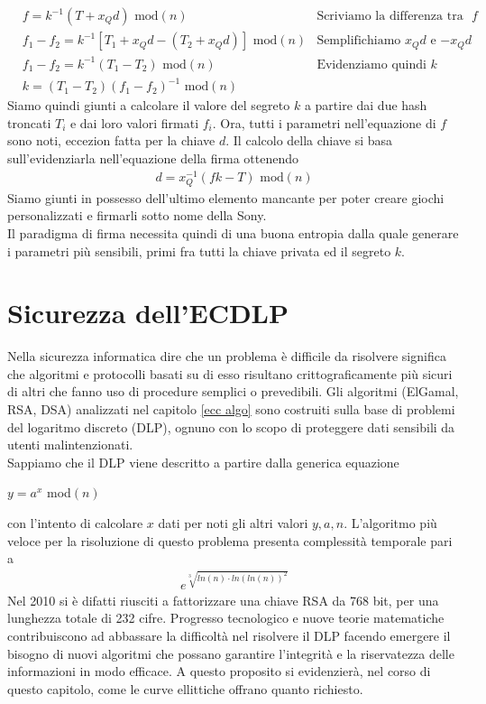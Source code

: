 \documentclass[a4paper,12pt]{tesiinfo}
\begin{document}
\begin{align*}
  &f = k^{-1} (T+x_Qd) \text{ mod}(n) &\text{Scriviamo la differenza tra le due $f$}\\
  &f_1 - f_2 = k^{-1} [T_1+x_Qd - (T_2 + x_Qd)] \text{ mod}(n) &\text{Semplifichiamo $x_Qd$ e $-x_Qd$}\\
  &f_1 - f_2 = k^{-1} (T_1 - T_2) \text{ mod$(n)$} &\text{Evidenziamo quindi $k$}\\
  &k= (T_1 - T_2)(f_1 - f_2)^{-1} \text{ mod$(n)$}
\end{align*}
Siamo quindi giunti a calcolare il valore del segreto $k$ a partire dai due hash troncati $T_i$ e dai loro valori firmati $f_i$. Ora, tutti i parametri nell'equazione di $f$ sono noti, eccezion fatta per la chiave $d$. Il calcolo della chiave si basa sull'evidenziarla nell'equazione della firma ottenendo
\begin{align*}
  d = x_Q^{-1}(fk-T) \text{ mod}(n) 
\end{align*}
Siamo giunti in possesso dell'ultimo elemento mancante per poter creare giochi personalizzati e firmarli sotto nome della Sony.
\\
Il paradigma di firma necessita quindi di una buona entropia dalla quale generare i parametri pi\`u sensibili, primi fra tutti la chiave privata ed il segreto $k$.
%
%
%
%
%
%
%
%
%
%
%
%
%
%
%
%
%
%
%
\chapter{Sicurezza dell'ECDLP}
\label{ecdlp}
Nella sicurezza informatica dire che un problema \`e difficile da risolvere significa che algoritmi e protocolli basati su di esso risultano crittograficamente pi\`u sicuri di altri che fanno uso di procedure semplici o prevedibili. Gli algoritmi (ElGamal, RSA, DSA) analizzati nel capitolo \ref{ecc algo} sono costruiti sulla base di problemi del logaritmo discreto (DLP), ognuno con lo scopo di proteggere dati sensibili da utenti malintenzionati.
\\
Sappiamo che il DLP viene descritto a partire dalla generica equazione
\begin{center}
 $y = a^x$ mod$(n)$
\end{center}
con l'intento di calcolare $x$ dati per noti gli altri valori $y, a, n$. L'algoritmo pi\`u veloce \cite{libro 900 pagine, dlp fast1} per la risoluzione di questo problema presenta complessit\`a temporale pari a
\begin{gather}
 e^{\sqrt[3]{ln(n) \cdot ln( ln( n) )^2}}
 \label{dlp enorme}
\end{gather}
Nel 2010 si \`e difatti riusciti a fattorizzare \cite{dlp fast2} una chiave RSA da 768 bit, per una lunghezza totale di 232 cifre. Progresso tecnologico e nuove teorie matematiche contribuiscono ad abbassare la difficolt\`a nel risolvere il DLP facendo emergere il bisogno di nuovi algoritmi che possano garantire l'integrit\`a e la riservatezza delle informazioni in modo efficace. A questo proposito si evidenzier\`a, nel corso di questo capitolo, come le curve ellittiche offrano quanto richiesto. 
\end{document}
